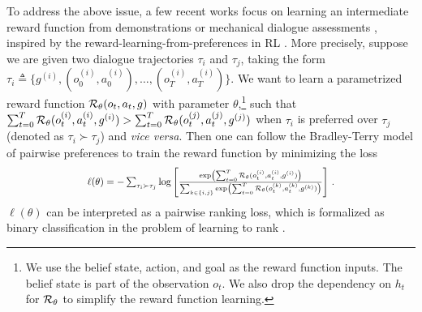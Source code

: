 To address the above issue, a few recent works focus on learning an intermediate reward function from demonstrations or mechanical dialogue assessments \citep[\eg,][]{wang2020learning,caspi2021}, inspired by the reward-learning-from-preferences in RL \citep[\eg,][]{christiano2017deep,trex2019,drex2020}.
More precisely, suppose we are given two dialogue trajectories $\tau_i$ and $\tau_j$, taking the form $\tau_i\triangleq\{g^{(i)}, (o_0^{(i)}, a_0^{(i)}),\ldots,(o_T^{(i)}, a_T^{(i)})\}$.
We want to learn a parametrized reward function ${\mathcal{R}}_{\theta}(o_t, a_t, g)$ with parameter $\theta$,\footnote{We use the belief state, action, and goal as the reward function inputs. 
The belief state is part of the observation $o_t$. We also drop the dependency on $h_t$ for ${\mathcal{R}}_{\theta}$ to simplify the reward function learning.} such that
$\sum_{t=0}^{T}{\mathcal{R}}_{\theta}(o_t^{(i)}, a_t^{(i)}, g^{(i)}) > \sum_{t=0}^{T}{\mathcal{R}}_{\theta}(o_t^{(j)}, a_t^{(j)}, g^{(j)})$ when $\tau_i$ is preferred over $\tau_j$ (denoted as $\tau_i \succ \tau_j$) and \textit{vice versa}. 
Then one can follow the  Bradley-Terry model of pairwise preferences \citep{bradley1952rank} to train the reward function by minimizing the loss
\begin{equation}\label{eq:original_pref_rew}\textstyle
\resizebox{.63\linewidth}{!}{%
$
    \ell(\theta) = -\sum_{\tau_i \succ \tau_j}\log \sbr{ \frac{\exp\br{\sum_{t=0}^{T}\gR_{\theta}(o_t^{(i)}, a_t^{(i)}, g^{(i)}) }}{\sum_{k \in \{i, j\}}\exp\br{\sum_{t=0}^{T}\gR_{\theta}(o_t^{(k)}, a_t^{(k)}, g^{(k)})} } }\,.
    $%
}
\end{equation}
$\ell(\theta)$ can be interpreted as a pairwise ranking loss, which is formalized as binary classification in the problem of learning to rank \citep{ranksvm1999,rankingboosting2003,ranknet2005}.

